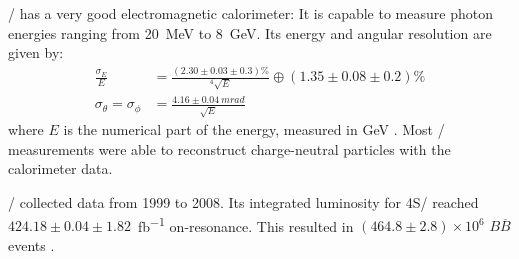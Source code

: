 \BaBar/ has a very good electromagnetic calorimeter:
It is capable to measure photon energies ranging from \SI{20}{MeV} to
\SI{8}{GeV}.
Its energy and angular resolution are given by:
\begin{align*}
    \frac{\sigma_E}{E} &= \frac{(2.30 \pm 0.03 \pm 0.3)\%}{^{4}\sqrt{E}}
    \oplus (1.35 \pm 0.08 \pm 0.2)\% \\
    \sigma_{\theta} = \sigma_{\phi} &= \frac{{4.16 \pm 0.04}~\si{mrad}}
        {\sqrt{E}}
\end{align*}
where $E$ is the numerical part of the energy, measured in
\si{GeV} \cite{Bauer:2005}.
Most \BaBar/ measurements were able to reconstruct charge-neutral particles with
the calorimeter data.

\BaBar/ collected data from 1999 to 2008. Its integrated luminosity for \Y4S/
reached $424.18 \pm 0.04 \pm 1.82$~\si{fb^{-1}} on-resonance.
This resulted in $(464.8 \pm 2.8) \times 10^6$ $B \overline{B}$
events \cite{Lees:2013rw}.
